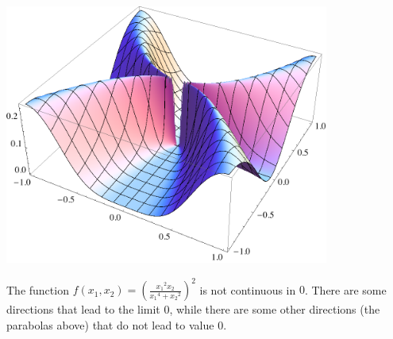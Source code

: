 \documentclass[computationalMathematics.tex]{subfiles}
\begin{document}
\begin{example}
\begin{center}
		\begin{minipage}{0.45\textwidth}
		\includegraphics[width=0.8\textwidth]{pics/27set/nondiff4.png}
	\end{minipage}
	\begin{minipage}{0.45\textwidth}
		The function $f(x_1,x_2) = {\left( \frac{{x_1}^2 x_2}{{x_1}^4 + {x_2}^2} \right)}^2$ is not continuous in $0$. There are some directions that lead to the limit $0$, while there are some other directions (the parabolas above) that do not lead to value $0$.
	\end{minipage}
	\end{center}
\end{example}
\end{document}
